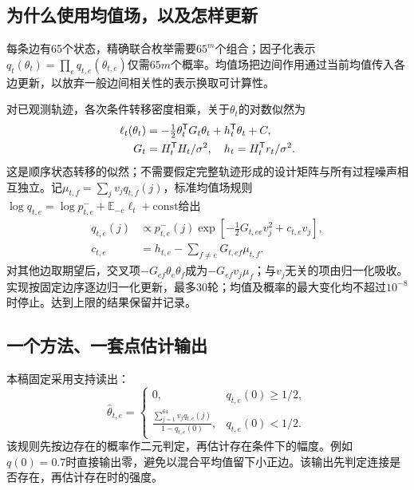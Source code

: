 \documentclass[journal]{IEEEtran}
\newcommand{\T}{\mathsf T}
\begin{document}
\subsection{为什么使用均值场，以及怎样更新}
每条边有65个状态，精确联合枚举需要$65^m$个组合；因子化表示$q_t(\theta_t)=\prod_e q_{t,e}(\theta_{t,e})$仅需$65m$个概率。均值场把边间作用通过当前均值传入各边更新，以放弃一般边间相关性的表示换取可计算性\cite{blei}。

对已观测轨迹，各次条件转移密度相乘，关于$\theta_t$的对数似然为
\begin{align}
\ell_t(\theta_t)&=-\tfrac12\theta_t^\T G_t\theta_t+h_t^\T\theta_t+C,\label{eq:like}\\
 G_t&=H_t^\T H_t/\sigma^2,\quad h_t=H_t^\T r_t/\sigma^2.\notag
\end{align}
这是顺序状态转移的似然；不需要假定完整轨迹形成的设计矩阵与所有过程噪声相互独立。记$\mu_{t,f}=\sum_jv_jq_{t,f}(j)$，标准均值场规则$\log q_{t,e}=\log p^-_{t,e}+\mathbb E_{-e}\ell_t+\mathrm{const}$给出
\begin{equation}
\begin{split}
 q_{t,e}(j)&\propto p^-_{t,e}(j)\exp[-\tfrac12G_{t,ee}v_j^2+c_{t,e}v_j],\\
 c_{t,e}&=h_{t,e}-\sum_{f\ne e}G_{t,ef}\mu_{t,f}.\label{eq:update}
\end{split}
\end{equation}
对其他边取期望后，交叉项$-G_{ef}\theta_e\theta_f$成为$-G_{ef}v_j\mu_f$；与$v_j$无关的项由归一化吸收。实现按固定边序逐边归一化更新，最多30轮；均值及概率的最大变化均不超过$10^{-8}$时停止。达到上限的结果保留并记录。

\subsection{一个方法、一套点估计输出}
本稿固定采用支持读出：
\begin{equation}
\hat\theta_{t,e}=\begin{cases}
0,&q_{t,e}(0)\geq1/2,\\
\displaystyle\frac{\sum_{j=1}^{64}v_jq_{t,e}(j)}{1-q_{t,e}(0)},&q_{t,e}(0)<1/2.
\end{cases}\label{eq:readout}
\end{equation}
该规则先按边存在的概率作二元判定，再估计存在条件下的幅度。例如$q(0)=0.7$时直接输出零，避免以混合平均值留下小正边。该输出先判定连接是否存在，再估计存在时的强度。
\end{document}
